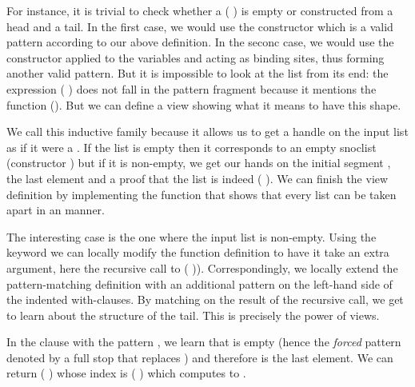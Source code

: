For instance, it is trivial to check whether a ( )
is empty or constructed from a head and a tail.
%
In the first case, we would use the constructor  which is a valid
pattern according to our above definition.
%
In the seconc case, we would use the constructor \IdrisData{(::)} applied to the
variables  and  acting as binding sites, thus
forming another valid pattern.
%
But it is impossible to look at the list from its end: the expression
( \IdrisFunction{++} \IdrisData{[}\IdrisData{]})
does not fall in the pattern fragment because it mentions the function (\IdrisFunction{++}).
But we can define a view showing what it means to have this shape.


We call this inductive family  because it allows us to get
a handle on the input list as if it were a . If the list is
empty then it corresponds to an empty snoclist (constructor )
but if it is non-empty, we get our hands on the initial segment ,
the last element  and a proof that the list is indeed
( \IdrisFunction{++} \IdrisData{[}\IdrisData{]}).
%
We can finish the view definition by implementing the function 
that shows that every list  can be taken apart in an 
manner.


The interesting case is the one where the input list is non-empty.
%
Using the  keyword we can locally modify the function
definition to have it take an extra argument, here the recursive call to
( )).
%
Correspondingly, we locally extend the pattern-matching definition with
an additional pattern on the left-hand side of the indented with-clauses.
%
By matching on the result of the recursive call, we get to learn about the
structure of the tail. This is precisely the power of views.

In the clause with the pattern \IdrisData{[<]}, we learn that  is empty
(hence the \emph{forced} pattern denoted by a full stop
\IdrisData{[]}\IdrisKeyword{)} that replaces )
and therefore  is the last element.
%
We can return (\IdrisData{[]} \IdrisData{:<} ) whose index is
(\IdrisData{[]} \IdrisFunction{++} \IdrisData{[}\IdrisData{]})
which computes to \IdrisData{[}\IdrisData{]}.

